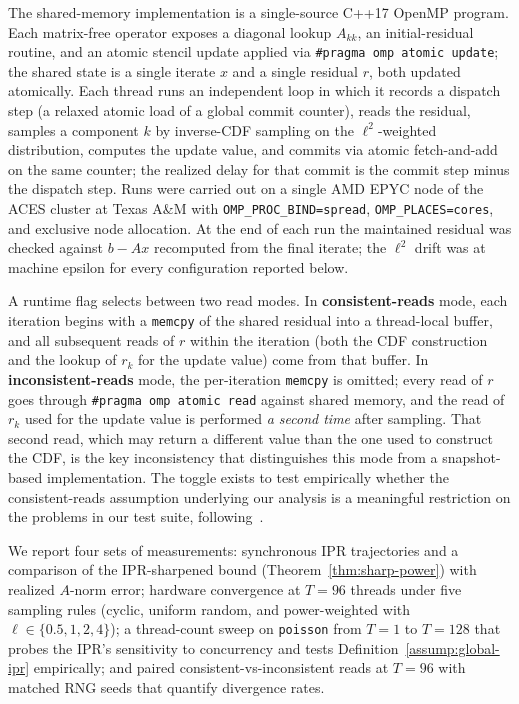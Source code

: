 \documentclass[pdflatex,sn-mathphys-num]{sn-jnl}%
\theoremstyle{thmstyleone}%
\theoremstyle{thmstyletwo}%
\theoremstyle{thmstylethree}%
\begin{document}

The shared-memory implementation is a single-source C++17 OpenMP
program. Each matrix-free operator exposes a diagonal lookup $A_{kk}$,
an initial-residual routine, and an atomic stencil update applied via
\texttt{\#pragma omp atomic update}; the shared state is a single
iterate $x$ and a single residual $r$, both updated atomically. Each
thread runs an independent loop in which it records a dispatch step
(a relaxed atomic load of a global commit counter), reads the residual,
samples a component $k$ by inverse-CDF sampling on the $\ell^2$-weighted
distribution, computes the update value, and commits via atomic
fetch-and-add on the same counter; the realized delay for that commit
is the commit step minus the dispatch step. Runs were carried out on a
single AMD EPYC node of the ACES cluster at Texas A\&M with
\texttt{OMP\_PROC\_BIND=spread}, \texttt{OMP\_PLACES=cores}, and
exclusive node allocation. At the end of each run the maintained
residual was checked against $b - Ax$ recomputed from the final iterate;
the $\ell^2$ drift was at machine epsilon for every configuration
reported below.
 
A runtime flag selects between two read modes. In
\textbf{consistent-reads} mode, each iteration begins with a
\texttt{memcpy} of the shared residual into a thread-local buffer, and
all subsequent reads of $r$ within the iteration (both the CDF
construction and the lookup of $r_k$ for the update value) come from
that buffer. In \textbf{inconsistent-reads} mode, the per-iteration
\texttt{memcpy} is omitted; every read of $r$ goes through
\texttt{\#pragma omp atomic read} against shared memory, and the read
of $r_k$ used for the update value is performed \emph{a second time}
after sampling. That second read, which may return a different value
than the one used to construct the CDF, is the key inconsistency that
distinguishes this mode from a snapshot-based implementation. The
toggle exists to test empirically whether the consistent-reads
assumption underlying our analysis is a meaningful restriction on the
problems in our test suite, following~\cite{avron2015revisiting}.

We report four sets of measurements: synchronous IPR trajectories and a
comparison of the IPR-sharpened bound (Theorem~\ref{thm:sharp-power})
with realized $A$-norm error; hardware convergence at $T = 96$ threads
under five sampling rules (cyclic, uniform random, and power-weighted
with $\ell \in \{0.5, 1, 2, 4\}$); a thread-count sweep on \texttt{poisson}
from $T=1$ to $T=128$ that probes the IPR's sensitivity to concurrency
and tests Definition~\ref{assump:global-ipr} empirically; and paired
consistent-vs-inconsistent reads at $T = 96$ with matched RNG seeds that
quantify divergence rates. 
\end{document}
